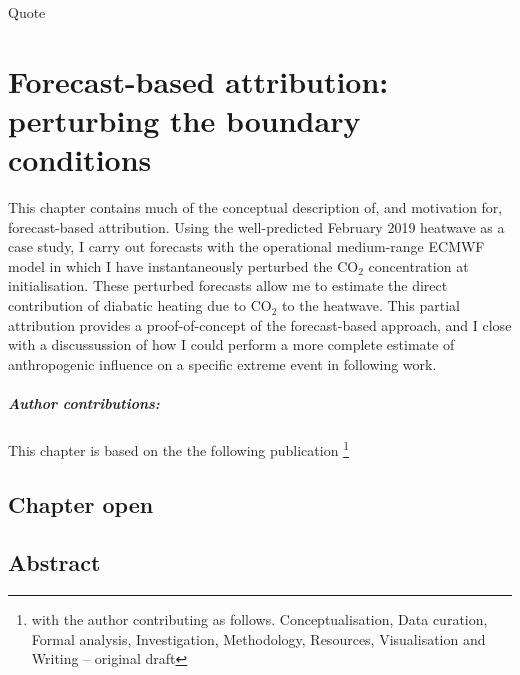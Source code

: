 \begin{savequote}[8cm]
    Quote
\end{savequote}
    
\chapter{\label{ch3}Forecast-based attribution: perturbing the boundary conditions}

This chapter contains much of the conceptual description of, and motivation for, forecast-based attribution. Using the well-predicted February 2019 heatwave as a case study, I carry out forecasts with the operational medium-range ECMWF model in which I have instantaneously perturbed the CO$_2$ concentration at initialisation. These perturbed forecasts allow me to estimate the direct contribution of diabatic heating due to CO$_2$ to the heatwave. This partial attribution provides a proof-of-concept of the forecast-based approach, and I close with a discussussion of how I could perform a more complete estimate of anthropogenic influence on a specific extreme event in following work.
\small\paragraph{Author contributions:} This chapter is based on the the following publication \footnote{with the author contributing as follows. Conceptualisation, Data curation, Formal analysis, Investigation, Methodology, Resources, Visualisation and Writing -- original draft} \par\vspace{1em}

\clearpage

\minitoc

\clearpage

\section{Chapter open}

\section{Abstract}

